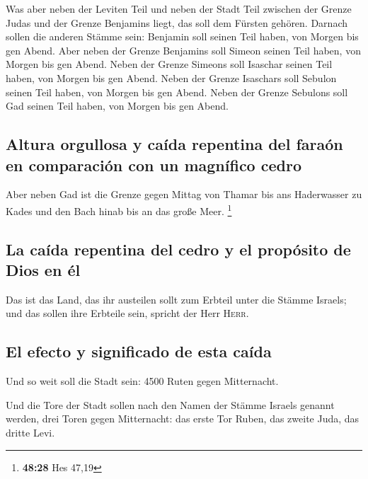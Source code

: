  Was aber neben der Leviten Teil und neben der Stadt Teil
zwischen der Grenze Judas und der Grenze Benjamins liegt, das soll dem
Fürsten gehören.  Darnach sollen die anderen Stämme sein:
Benjamin soll seinen Teil haben, von Morgen bis gen Abend.
 Aber neben der Grenze Benjamins soll Simeon seinen Teil
haben, von Morgen bis gen Abend.  Neben der Grenze
Simeons soll Isaschar seinen Teil haben, von Morgen bis gen Abend.
 Neben der Grenze Isaschars soll Sebulon seinen Teil
haben, von Morgen bis gen Abend.  Neben der Grenze
Sebulons soll Gad seinen Teil haben, von Morgen bis gen Abend.

\hypertarget{altura-orgullosa-y-cauxedda-repentina-del-farauxf3n-en-comparaciuxf3n-con-un-magnuxedfico-cedro}{%
\subsection{Altura orgullosa y caída repentina del faraón en comparación
con un magnífico
cedro}\label{altura-orgullosa-y-cauxedda-repentina-del-farauxf3n-en-comparaciuxf3n-con-un-magnuxedfico-cedro}}

 Aber neben Gad ist die Grenze gegen Mittag von Thamar
bis ans Haderwasser zu Kades und den Bach hinab bis an das große Meer.
\footnote{\textbf{48:28} Hes 47,19}

\hypertarget{la-cauxedda-repentina-del-cedro-y-el-propuxf3sito-de-dios-en-uxe9l}{%
\subsection{La caída repentina del cedro y el propósito de Dios en
él}\label{la-cauxedda-repentina-del-cedro-y-el-propuxf3sito-de-dios-en-uxe9l}}

 Das ist das Land, das ihr austeilen sollt zum Erbteil
unter die Stämme Israels; und das sollen ihre Erbteile sein, spricht der
Herr \textsc{Herr}.

\hypertarget{el-efecto-y-significado-de-esta-cauxedda}{%
\subsection{El efecto y significado de esta
caída}\label{el-efecto-y-significado-de-esta-cauxedda}}

 Und so weit soll die Stadt sein: 4500 Ruten gegen
Mitternacht.

 Und die Tore der Stadt sollen nach den Namen der Stämme
Israels genannt werden, drei Toren gegen Mitternacht: das erste Tor
Ruben, das zweite Juda, das dritte Levi.

